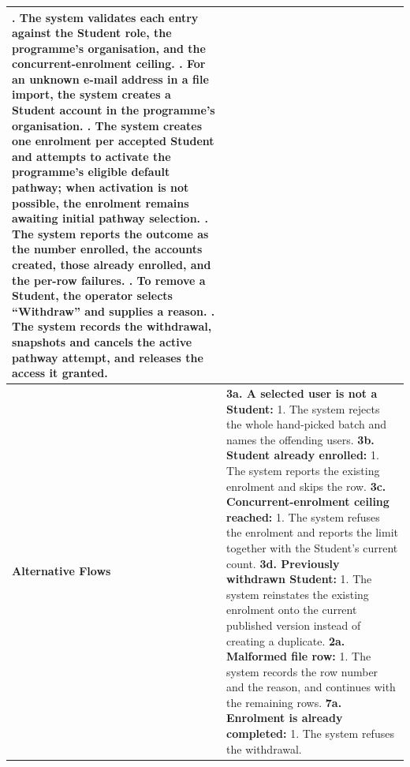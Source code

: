 \begin{longtable}{|>{\raggedright\arraybackslash}p{}|>{\raggedright\arraybackslash}p{}|}
3. The system validates each entry against the Student role, the programme's organisation, and the concurrent-enrolment ceiling. \newline
4. For an unknown e-mail address in a file import, the system creates a Student account in the programme's organisation. \newline
5. The system creates one enrolment per accepted Student and attempts to activate the programme's eligible default pathway; when activation is not possible, the enrolment remains awaiting initial pathway selection. \newline
6. The system reports the outcome as the number enrolled, the accounts created, those already enrolled, and the per-row failures. \newline
7. To remove a Student, the operator selects ``Withdraw'' and supplies a reason. \newline
8. The system records the withdrawal, snapshots and cancels the active pathway attempt, and releases the access it granted. \\ \hline
\textbf{Alternative Flows} &
\textbf{3a. A selected user is not a Student:} \newline
\hspace*{1em}1. The system rejects the whole hand-picked batch and names the offending users. \newline
\textbf{3b. Student already enrolled:} \newline
\hspace*{1em}1. The system reports the existing enrolment and skips the row. \newline
\textbf{3c. Concurrent-enrolment ceiling reached:} \newline
\hspace*{1em}1. The system refuses the enrolment and reports the limit together with the Student's current count. \newline
\textbf{3d. Previously withdrawn Student:} \newline
\hspace*{1em}1. The system reinstates the existing enrolment onto the current published version instead of creating a duplicate. \newline
\textbf{2a. Malformed file row:} \newline
\hspace*{1em}1. The system records the row number and the reason, and continues with the remaining rows. \newline
\textbf{7a. Enrolment is already completed:} \newline
\hspace*{1em}1. The system refuses the withdrawal. \\
\end{longtable}

